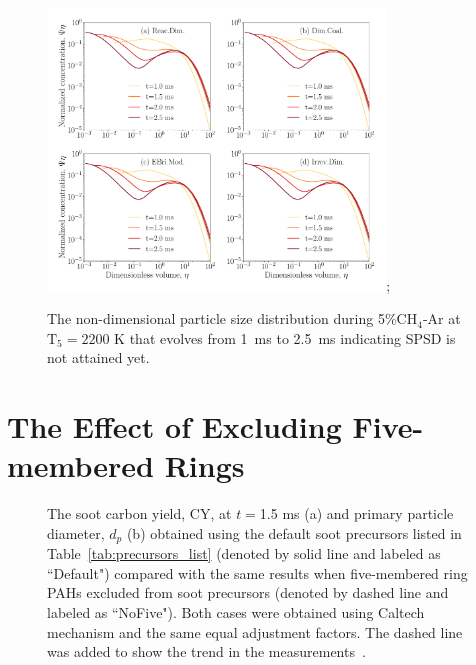 \begin{figure}[H]
	\centering
	\includegraphics[width=0.8\textwidth]{Figures/Results/Shocktube/Agafonov2016_cpr/5CH4_psd.pdf};
	\caption{The non-dimensional particle size distribution during 5\%$\mathrm{CH_4}$-Ar at $\mathrm{T_5}=2200$ K that evolves from 1~ms to 2.5~ms indicating SPSD is not attained yet.}
	\label{fig:shockagof_psd} 
\end{figure}

\section{The Effect of Excluding Five-membered Rings}

\begin{figure}[H]
	\centering
	\caption{The soot carbon yield, CY, at $t=$1.5 ms (a) and primary particle diameter, $d_p$ (b) obtained using the default soot precursors listed in Table~\ref{tab:precursors_list} (denoted by solid line and labeled as ``Default") compared with the same results when five-membered ring PAHs  excluded from soot precursors (denoted by dashed line and labeled as ``NoFive"). Both cases were obtained using Caltech mechanism and the same equal adjustment factors. The dashed line was added to show the trend in the measurements~\citep{agafonov2016unified}.}
	\label{fig:shockagof_yieldspc_cpr} 
\end{figure}

